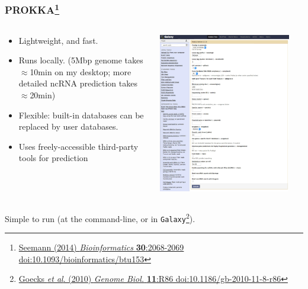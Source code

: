 \begin{frame}
  \frametitle{PROKKA\footnote{\tiny{\href{http://dx.doi.org/10.1093/bioinformatics/btu153}{Seemann (2014) \textit{Bioinformatics} \textbf{30}:2068-2069 doi:10.1093/bioinformatics/btu153}}}}
  \begin{columns}
    \begin{column}{5cm}
      \begin{itemize}
        \item Lightweight, and fast. 
        \item Runs locally. (5Mbp genome takes $\approx$10min on my desktop; more detailed ncRNA prediction takes $\approx$20min)
        \item Flexible: built-in databases can be replaced by user databases.
        \item Uses freely-accessible third-party tools for prediction
      \end{itemize}
    \end{column}
    \begin{column}{5cm}
      \includegraphics[width=0.9\textwidth]{images/prokka_galaxy}
    \end{column}
  \end{columns}
  Simple to run (at the command-line, or in \texttt{Galaxy}\footnote{\tiny{\href{http://dx.doi.org/10.1186/gb-2010-11-8-r86}{Goecks \textit{et al}. (2010) \textit{Genome Biol.} \textbf{11}:R86 doi:10.1186/gb-2010-11-8-r86}}}). \\
\end{frame}

